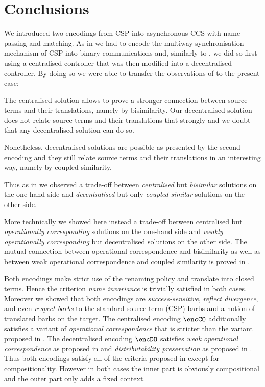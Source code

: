 \documentclass[copyright,creativecommons]{eptcs}
\begin{document}
\section{Conclusions}
\label{sec:conclusion}
 
We introduced two encodings from CSP into asynchronous CCS with name passing and matching.
As in \cite{parrowCoupled92} we had to encode the multiway synchronisation mechanism of CSP into binary communications and, similarly to \cite{parrowCoupled92}, we did so first using a centralised controller that was then modified into a decentralised controller.
By doing so we were able to transfer the observations of \cite{parrowCoupled92} to the present case:
\begin{compactenum}
	\item The centralised solution allows to prove a stronger connection between source terms and their translations, namely by bisimilarity. Our decentralised solution does not relate source terms and their translations that strongly and we doubt that any decentralised solution can do so.
	\item Nonetheless, decentralised solutions are possible as presented by the second encoding and they still relate source terms and their translations in an interesting way, namely by coupled similarity.
\end{compactenum}
Thus as in \cite{parrowCoupled92} we observed a trade-off between \emph{centralised} but \emph{bisimilar} solutions on the one-hand side and \emph{decentralised} but only \emph{coupled similar} solutions on the other side.

More technically we showed here instead a trade-off between centralised but \emph{operationally corresponding} solutions on the one-hand side and \emph{weakly operationally corresponding} but decentralised solutions on the other side.
The mutual connection between operational correspondence and bisimilarity as well as between weak operational correspondence and coupled similarity is proved in \cite{petersGlabbeek15}.

Both encodings make strict use of the renaming policy and translate into closed terms.
Hence the criterion \emph{name invariance} is trivially satisfied in both cases.
Moreover we showed that both encodings are \emph{success-sensitive}, \emph{reflect divergence}, and even \emph{respect barbs} \wrt to the standard source term (CSP) barbs and a notion of translated barbs on the target.
The centralised encoding $ \encCO $ additionally satisfies a variant of \emph{operational correspondence} that is stricter than the variant proposed in \cite{gorla10}.
The decentralised encoding $ \encDO $ satisfies \emph{weak operational correspondence} as proposed in \cite{gorla10} and \emph{distributability preservation} as proposed in \cite{petersNestmannGoltz13}.
Thus both encodings satisfy all of the criteria proposed in \cite{gorla10} except for compositionality.
However in both cases the inner part is obviously compositional and the outer part only adds a fixed context.

\providecommand{\thisvolume}[2][]{this volume of EPTCS}
\def\opa{}

\end{document}
